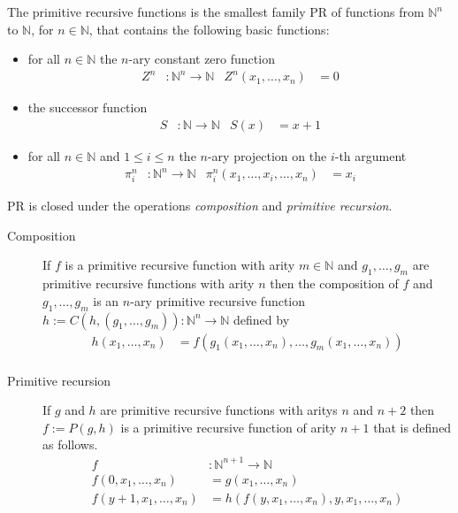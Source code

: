 \documentclass{jfp}
\newcommand{\xn}{x_1,\dots,x_n }
\begin{document}
The primitive recursive functions is the smallest family PR of functions
from ${ℕ}^n$  to ${ℕ}$, for $n\in {ℕ}$, that contains the following
basic functions:
\begin{itemize}
\item for all $n\in {ℕ}$ the $n$-ary constant zero function
  \begin{align*}
	Z^n  &\colon \mathbb{N}^n \rightarrow \mathbb{N}  &
	Z^n    (\xn) &= 0  
  \end{align*}
\item the successor function
  \begin{align*}
	S &\colon \mathbb{N} \rightarrow \mathbb{N} &
	S  (x)  &=  x + 1
  \end{align*}
\item for all $n\in {ℕ}$ and $1\le i\le n$ the $n$-ary projection on
  the $i$-th argument
\begin{align*}
	\pi^{n}_{i} &\colon \mathbb{N}^n \rightarrow \mathbb{N} &
	\pi^{n}_{i}  (x_1,\dots,x_i,\dots,x_n)  &= x_i
\end{align*}
\end{itemize}
PR is closed under the operations \emph{composition} and \emph{primitive recursion}.
\begin{description}
\item[Composition] 
If $f$ is a primitive recursive function with arity $m \in {ℕ}$ and $g_1,
\dots, g_m$ are primitive recursive functions with arity $n$ then the
composition of $f$ and $g_1, \dots, g_m$ is an $n$-ary primitive recursive function
$h := C (h,(g_1,\dots, g_m)) \colon \mathbb{N}^n \rightarrow \mathbb{N} $ defined by
\begin{align*}
	h  (\xn)  &= f (g_1(\xn),\dots,g_m(\xn)) \\
\end{align*}

\item[Primitive recursion] 
If $g$ and $h$ are primitive recursive functions with aritys $n$ and
$n+2$ then $f := P (g,h)$ is a primitive recursive function of arity $n+1$ that is defined as follows.
\begin{align*}
	f&\colon \mathbb{N}^{n+1} \rightarrow \mathbb{N} \\
	f  (0,\xn)  &= g (\xn) \\
	f  (y + 1,\xn) &= h(  f(y,\xn),y,\xn)
\end{align*}

\end{description}

 
\end{document}
